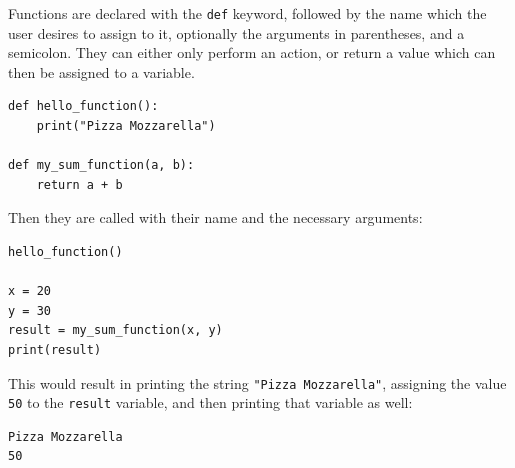 \documentclass[a4paper,12pt]{article}
\begin{document}
Functions are declared with the \verb|def| keyword, followed by the name which the user desires to assign to it, optionally the arguments in parentheses, and a semicolon. They can either only perform an action, or return a value which can then be assigned to a variable.

\begin{tcolorbox}[
    enhanced,
    attach boxed title to top left={xshift=6mm,yshift=-3mm},
    colback=lightgreen!20,
    colframe=lightgreen,
    colbacktitle=lightgreen,
    title=Python,
    fonttitle=\bfseries\color{black},
    boxed title style={size=small,colframe=lightgreen,sharp corners},
    sharp corners,
    ]
    \begin{verbatim}
def hello_function():
    print("Pizza Mozzarella")

def my_sum_function(a, b):
    return a + b
    \end{verbatim}
\end{tcolorbox}

Then they are called with their name and the necessary arguments:

\begin{tcolorbox}[
    enhanced,
    attach boxed title to top left={xshift=6mm,yshift=-3mm},
    colback=lightgreen!20,
    colframe=lightgreen,
    colbacktitle=lightgreen,
    title=Python,
    fonttitle=\bfseries\color{black},
    boxed title style={size=small,colframe=lightgreen,sharp corners},
    sharp corners,
    ]
    \begin{verbatim}
hello_function()

x = 20
y = 30
result = my_sum_function(x, y)
print(result)
    \end{verbatim}
\end{tcolorbox}

This would result in printing the string \verb|"Pizza Mozzarella"|, assigning the value \verb|50| to the \verb|result| variable, and then printing that variable as well:

\begin{tcolorbox}[
    enhanced,
    attach boxed title to top left={xshift=6mm,yshift=-3mm},
    colback=lightgray!20,
    colframe=lightgray,
    colbacktitle=lightgray,
    title=Output,
    fonttitle=\bfseries\color{black},
    boxed title style={size=small,colframe=lightgray,sharp corners},
    sharp corners,
    ]
    \begin{verbatim}
Pizza Mozzarella
50
    \end{verbatim}
\end{tcolorbox}
\end{document}
